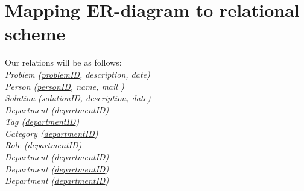 \section{Mapping ER-diagram to relational scheme}
\label{sec:map_er_rel}

Our relations will be as follows: \\

\textit{Problem (\underline{problemID}, description, date)} \\
\textit{Person (\underline{personID}, name, mail )} \\
\textit{Solution (\underline{solutionID}, description, date)} \\
\textit{Department (\underline{departmentID})} \\
\textit{Tag (\underline{departmentID})} \\
\textit{Category (\underline{departmentID})} \\
\textit{Role (\underline{departmentID})} \\
\textit{Department (\underline{departmentID})} \\
\textit{Department (\underline{departmentID})} \\
\textit{Department (\underline{departmentID})} \\



